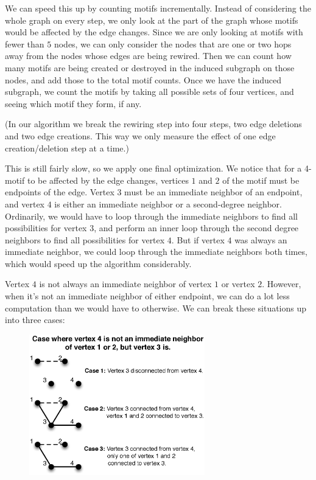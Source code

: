 We can speed this up by counting motifs incrementally.  Instead of considering the whole graph on every step, we only look at the part of the graph whose motifs would be affected by the edge changes.  Since we are only looking at motifs with fewer than $5$ nodes, we can only consider the nodes that are one or two hops away from the nodes whose edges are being rewired.  Then we can count how many motifs are being created or destroyed in the induced subgraph on those nodes, and add those to the total motif counts.  Once we have the induced subgraph, we count the motifs by taking all possible sets of four vertices, and seeing which motif they form, if any.

(In our algorithm we break the rewiring step into four steps, two edge deletions and two edge creations.  This way we only measure the effect of one edge creation/deletion step at a time.)

This is still fairly slow, so we apply one final optimization.  We notice that for a 4-motif to be affected by the edge changes, vertices $1$ and $2$ of the motif must be endpoints of the edge.  Vertex $3$ must be an immediate neighbor of an endpoint, and vertex $4$ is either an immediate neighbor or a second-degree neighbor.  Ordinarily, we would have to loop through the immediate neighbors to find all possibilities for vertex $3$, and perform an inner loop through the second degree neighbors to find all possibilities for vertex $4$.  But if vertex $4$ was always an immediate neighbor, we could loop through the immediate neighbors both times, which would speed up the algorithm considerably.

Vertex $4$ is not always an immediate neighbor of vertex $1$ or vertex $2$.  However, when it's not an immediate neighbor of either endpoint, we can do a lot less computation than we would have to otherwise.  We can break these situations up into three cases:

\begin{figure}
\centering
\includegraphics[width=3in]{Figures/case1.eps}
\label{fig:case}
\end{figure}

